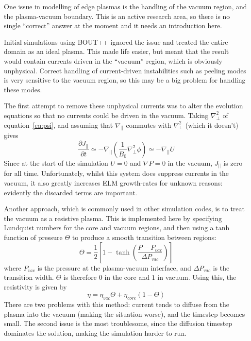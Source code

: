 \documentclass[12pt, a4paper]{article}
\newcommand{\deriv}[2]{\ensuremath{\frac{\partial #1}{\partial #2}}}
\newcommand{\Jpar}{J_{||}}
\newcommand{\delp}{\nabla_\perp^2}
\begin{document}
One issue in modelling of edge plasmas is the handling of the vacuum region,
and the plasma-vacuum boundary. This is an active research area, so there is no
single ``correct'' answer at the moment and it needs an introduction here.

Initial simulations using BOUT++ ignored the issue and treated the entire
domain as an ideal plasma. This made life easier, but meant that the result
would contain currents driven in the ``vacuum'' region, which is obviously unphysical.
Correct handling of current-driven instabilities such as peeling modes is
very sensitive to the vacuum region, so this may be a big problem for handling these modes.

The first attempt to remove these unphysical currents was to alter the evolution
equations so that no currents could be driven in the vacuum. Taking $\delp$ of
equation~\ref{eq:psi}, and assuming that $\nabla_{||}$ commutes with $\delp$
(which it doesn't) gives
\begin{equation}
\deriv{\Jpar}{t} \simeq -\nabla_{||}\left(\frac{1}{B_0}\delp\phi\right) \simeq -\nabla_{||} U
\label{eq:jparevolve}
\end{equation}
Since at the start of the simulation $U=0$ and $\nabla P=0$ in the vacuum, $\Jpar$ is
zero for all time. Unfortunately, whilst this system does suppress currents in the vacuum,
it also greatly increases ELM growth-rates for unknown reasons: evidently the discarded terms
are important.

Another approach, which is commonly used in other simulation codes, is to treat the
vacuum as a resistive plasma. This is implemented here by specifying Lundquist numbers
for the core and vacuum regions, and then using a tanh function of pressure $\Theta$ to
produce a smooth transition between regions: 
\begin{equation}
\Theta = \frac{1}{2}\left[1-\tanh\left(\frac{P - P_{vac}}{\Delta P_{vac}}\right)\right]
\label{eq:vacmask}
\end{equation}
where $P_{vac}$ is the pressure at the plasma-vacuum interface, and $\Delta P_{vac}$
is the transition width. $\Theta$ is therefore $0$ in the core and $1$ in vacuum. Using this, the
resistivity is given by
\begin{equation}
\eta = \eta_{vac}\Theta + \eta_{core}\left(1-\Theta\right)
\end{equation}
There are two problems with this method: current tends
to diffuse from the plasma into the vacuum (making the situation worse), and the timestep
becomes small. The second issue is the most troublesome, since the diffusion timestep
dominates the solution, making the simulation harder to run.
\end{document}
